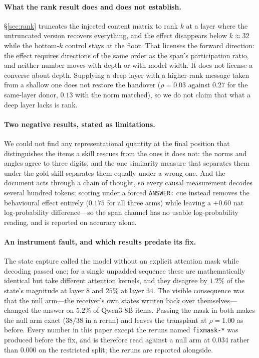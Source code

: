 \documentclass{article}
\begin{document}
\paragraph{What the rank result does and does not establish.}
\S\ref{sec:rank} truncates the injected content matrix to rank $k$ at a layer
where the untruncated version recovers everything, and the effect disappears
below $k\approx32$ while the bottom-$k$ control stays at the floor. That
licenses the forward direction: the effect requires directions of the same order
as the span's participation ratio, and neither number moves with depth or with
model width. It does not license a converse about depth. Supplying a deep layer
with a higher-rank message taken from a shallow one does not restore the
handover ($\rho=0.03$ against $0.27$ for the same-layer donor, $0.13$ with the
norm matched), so we do not claim that what a deep layer lacks is rank.

\paragraph{Two negative results, stated as limitations.} We could not find any
representational quantity at the final position that distinguishes the items a
skill rescues from the ones it does not: the norms and angles agree to three
digits, and the one similarity measure that separates them under the gold skill
separates them equally under a wrong one. And the document acts through a chain
of thought, so every causal measurement decodes several hundred tokens; scoring
under a forced \texttt{ANSWER:} cue instead removes the behavioural effect
entirely ($0.175$ for all three arms) while leaving a $+0.60$ nat
log-probability difference---so the span channel has no usable log-probability
reading, and is reported on accuracy alone.

\paragraph{An instrument fault, and which results predate its fix.} The state
capture called the model without an explicit attention mask while decoding
passed one; for a single unpadded sequence these are mathematically identical
but take different attention kernels, and they disagree by $1.2\%$ of the
state's magnitude at layer 8 and $25\%$ at layer 34. The visible consequence was
that the null arm---the receiver's own states written back over
themselves---changed the answer on $5.2\%$ of Qwen3-8B items. Passing the mask in
both makes the null arm exact ($38/38$ in a rerun) and leaves the transplant at
$\rho = 1.00$ as before. Every number in this paper except the reruns named
\texttt{fixmask-*} was produced before the fix, and is therefore read against a
null arm at $0.034$ rather than $0.000$ on the restricted split; the reruns are
reported alongside.
\end{document}
